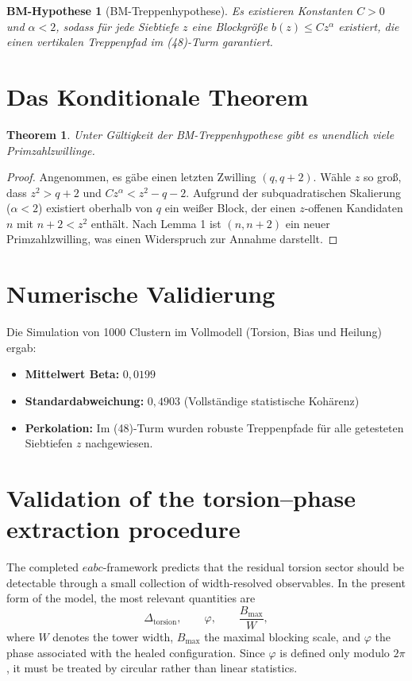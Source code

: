 \documentclass[11pt,a4paper]{article}
\newtheorem{theorem}{Theorem}
\newtheorem{hypothesis}{BM-Hypothese}
\begin{document}
	\begin{hypothesis}[BM-Treppenhypothese]
		Es existieren Konstanten $C > 0$ und $\alpha < 2$, sodass für jede Siebtiefe $z$ eine Blockgröße $b(z) \leq C z^\alpha$ existiert, die einen vertikalen Treppenpfad im (48)-Turm garantiert.
	\end{hypothesis}
	
	\section{Das Konditionale Theorem}
	
	\begin{theorem}
		Unter Gültigkeit der BM-Treppenhypothese gibt es unendlich viele Primzahlzwillinge.
	\end{theorem}
	
	\begin{proof}
		Angenommen, es gäbe einen letzten Zwilling $(q, q+2)$. Wähle $z$ so groß, dass $z^2 > q+2$ und $C z^\alpha < z^2 - q - 2$. Aufgrund der subquadratischen Skalierung ($\alpha < 2$) existiert oberhalb von $q$ ein weißer Block, der einen $z$-offenen Kandidaten $n$ mit $n+2 < z^2$ enthält. Nach Lemma 1 ist $(n, n+2)$ ein neuer Primzahlzwilling, was einen Widerspruch zur Annahme darstellt.
	\end{proof}
	
	\section{Numerische Validierung}
	Die Simulation von 1000 Clustern im Vollmodell (Torsion, Bias und Heilung) ergab:
	\begin{itemize}
		\item \textbf{Mittelwert Beta:} $0,0199$
		\item \textbf{Standardabweichung:} $0,4903$ (Vollständige statistische Kohärenz)
		\item \textbf{Perkolation:} Im (48)-Turm wurden robuste Treppenpfade für alle getesteten Siebtiefen $z$ nachgewiesen.
	\end{itemize}
	
	\section{Validation of the torsion--phase extraction procedure}
	
	The completed \(eabc\)-framework predicts that the residual torsion sector should be detectable through a small collection of width-resolved observables. In the present form of the model, the most relevant quantities are
	\begin{equation}\label{eq:torsion-phase-observables}
		\Delta_{\mathrm{torsion}},
		\qquad
		\varphi,
		\qquad
		\frac{B_{\max}}{W},
	\end{equation}
	where \(W\) denotes the tower width, \(B_{\max}\) the maximal blocking scale, and \(\varphi\) the phase associated with the healed configuration. Since \(\varphi\) is defined only modulo \(2\pi\), it must be treated by circular rather than linear statistics.
	
\end{document}
